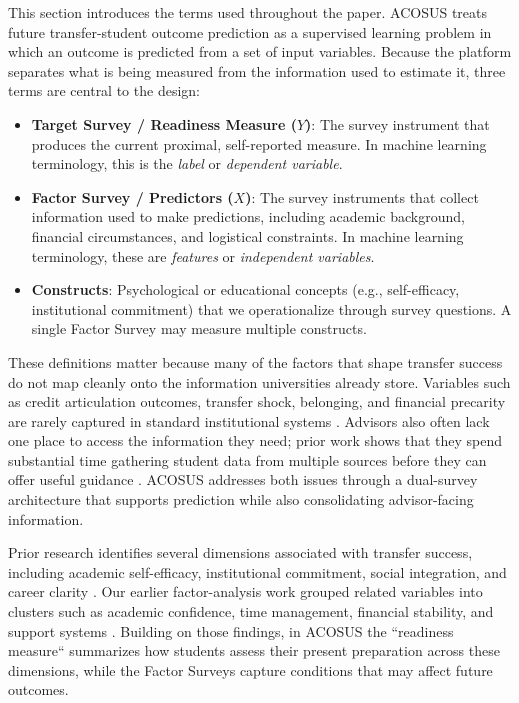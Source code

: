\documentclass[letterpaper,11pt]{article}
\begin{document}
This section introduces the terms used throughout the paper. ACOSUS treats future transfer-student outcome prediction as a supervised learning problem in which an outcome is predicted from a set of input variables. Because the platform separates what is being measured from the information used to estimate it, three terms are central to the design:

\begin{itemize}
    \item \textbf{Target Survey / Readiness Measure ($Y$)}: The survey instrument that produces the current proximal, self-reported measure. In machine learning terminology, this is the \emph{label} or \emph{dependent variable}.
    \item \textbf{Factor Survey / Predictors ($X$)}: The survey instruments that collect information used to make predictions, including academic background, financial circumstances, and logistical constraints. In machine learning terminology, these are \emph{features} or \emph{independent variables}.
    \item \textbf{Constructs}: Psychological or educational concepts (e.g., self-efficacy, institutional commitment) that we operationalize through survey questions. A single Factor Survey may measure multiple constructs.
\end{itemize}

These definitions matter because many of the factors that shape transfer success do not map cleanly onto the information universities already store. Variables such as credit articulation outcomes, transfer shock, belonging, and financial precarity are rarely captured in standard institutional systems \parencite{nguyen2025school}. Advisors also often lack one place to access the information they need; prior work shows that they spend substantial time gathering student data from multiple sources before they can offer useful guidance \parencite{preposttransfer2014}. ACOSUS addresses both issues through a dual-survey architecture that supports prediction while also consolidating advisor-facing information.

Prior research identifies several dimensions associated with transfer success, including academic self-efficacy, institutional commitment, social integration, and career clarity \parencite{factoranalysis2023}. Our earlier factor-analysis work grouped related variables into clusters such as academic confidence, time management, financial stability, and support systems \parencite{factoranalysis2023}. Building on those findings, in ACOSUS the ``readiness measure`` summarizes how students assess their present preparation across these dimensions, while the Factor Surveys capture conditions that may affect future outcomes.
\end{document}
